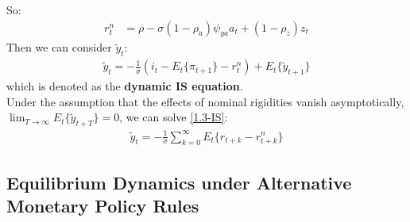 \documentclass{article}
\numberwithin{equation}{section}
\begin{document}
So:
	\begin{align}
		r^n_t &= \rho - \sigma(1 - \rho_a)\psi_{ya}a_t + (1 - \rho_z)z_t \label{1.3-rn}
	\end{align}
Then we can consider $\tilde{y}_t$:
	\begin{align}
		\tilde{y}_t = - \frac{1}{\sigma}(i_t - E_t\{\pi_{t+1}\} - r^n_t) + E_t\{\tilde{y}_{t+1}\} \label{1.3-IS}
	\end{align}
which is denoted as the \textbf{dynamic IS equation}.\\
Under the assumption that the effects of nominal rigidities vanish asymptotically, $\lim_{T \to \infty}E_t\{\tilde{y}_{t+T}\} = 0$, we can solve \eqref{1.3-IS}:
	\begin{align*}
		\tilde{y}_t = - \frac{1}{\sigma} \sum\limits^\infty_{k=0} E_t\{r_{t+k} - r^n_{t+k}\}
	\end{align*}


\subsection{Equilibrium Dynamics under Alternative Monetary Policy Rules}
\end{document}
